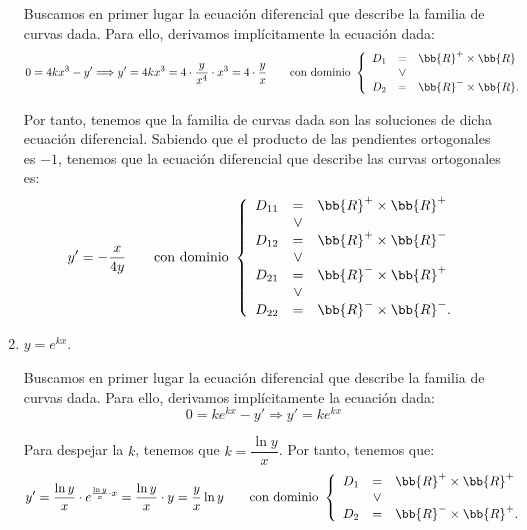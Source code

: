 \begin{ejercicio}
\begin{enumerate}
        Buscamos en primer lugar la ecuación diferencial que describe la familia de curvas dada. Para ello, derivamos implícitamente la ecuación dada:
        \begin{equation*}
            0 = 4kx^3 - y' \Longrightarrow y' = 4kx^3 = 4\cdot \dfrac{y}{x^4} \cdot x^3 = 4\cdot \dfrac{y}{x} \qquad \text{con dominio } \left\{\begin{array}{rcl}
                D_1&=&\bb{R}^+\times \bb{R}\\
                &\lor& \\
                D_2&=&\bb{R}^-\times \bb{R}.
            \end{array}\right.
        \end{equation*}

        Por tanto, tenemos que la familia de curvas dada son las soluciones de dicha ecuación diferencial.
        Sabiendo que el producto de las pendientes ortogonales es $-1$, tenemos que la ecuación diferencial que describe las curvas ortogonales es:
        \begin{equation*}
            y' = -\dfrac{x}{4y} \qquad \text{con dominio } \left\{\begin{array}{rcl}
                D_{11}&=&\bb{R}^+\times \bb{R}^+\\
                &\lor& \\
                D_{12}&=&\bb{R}^+\times \bb{R}^-\\
                &\lor& \\
                D_{21}&=&\bb{R}^-\times \bb{R}^+\\
                &\lor& \\
                D_{22}&=&\bb{R}^-\times \bb{R}^-.
            \end{array}\right.
        \end{equation*}
        \item\label{itm:ej1.4_c} \(y = e^{kx}\).
        
        Buscamos en primer lugar la ecuación diferencial que describe la familia de curvas dada. Para ello, derivamos implícitamente la ecuación dada:
        \begin{equation*}
            0 = ke^{kx} - y' \Longrightarrow y' = ke^{kx}
        \end{equation*}

        Para despejar la $k$, tenemos que $k = \dfrac{\ln y}{x}$. Por tanto, tenemos que:
        \begin{equation*}
            y' = \dfrac{\ln y}{x}\cdot e^{\frac{\ln y}{x}\cdot x} = \dfrac{\ln y}{x}\cdot y = \dfrac{y}{x}\ln y \qquad \text{con dominio } \left\{\begin{array}{rcl}
                D_1&=&\bb{R}^+\times \bb{R}^+\\
                &\lor& \\
                D_2&=&\bb{R}^- \times \bb{R}^+.
            \end{array}\right.
        \end{equation*}


\end{enumerate}
\end{ejercicio}
